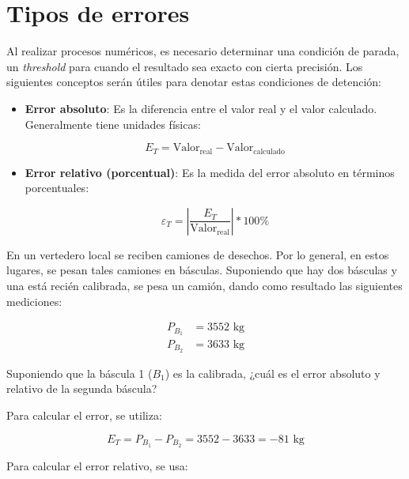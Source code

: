 \section{Tipos de errores}

Al realizar procesos numéricos, es necesario determinar una condición de
parada, un \emph{threshold} para cuando el resultado sea exacto con
cierta precisión. Los siguientes conceptos serán útiles para denotar
estas condiciones de detención:

\begin{itemize}
    \item
        \textbf{Error absoluto}: Es la diferencia entre el valor real y el
        valor calculado. Generalmente tiene unidades físicas:

        \begin{equation*}{
                E_T = \text{Valor}_{\text{real}} - \text{Valor}_{\text{calculado}}
        }\end{equation*}
    \item
        \textbf{Error relativo (porcentual)}: Es la medida del error absoluto
        en términos porcentuales:

        \begin{equation*}{
                \varepsilon_{T} = \left| {\frac{E_T}{\text{Valor}_{\text{real}}}} \right| * 100 \%
        }\end{equation*}
\end{itemize}


\begin{ex}

    En un vertedero local se reciben camiones de desechos. Por lo general,
    en estos lugares, se pesan tales camiones en básculas. Suponiendo que
    hay dos básculas y una está recién calibrada, se pesa un camión, dando
    como resultado las siguientes mediciones:

    \begin{eqnarray*}
        P_{B_1} &= 3552\text{ kg}\\
        P_{B_2} &= 3633\text{ kg}
    \end{eqnarray*}

    Suponiendo que la báscula 1 (\(B_1\)) es la calibrada, ¿cuál es el error
    absoluto y relativo de la segunda báscula?

    \begin{solution}
        Para calcular el error, se utiliza:

        \begin{equation*}{
                E_T = P_{B_1} - P_{B_2} = 3552 - 3633 = -81 \text{ kg}
        }\end{equation*}

        Para calcular el error relativo, se usa:

        \begin{center}
        \end{center}

    \end{solution}


\end{ex}


